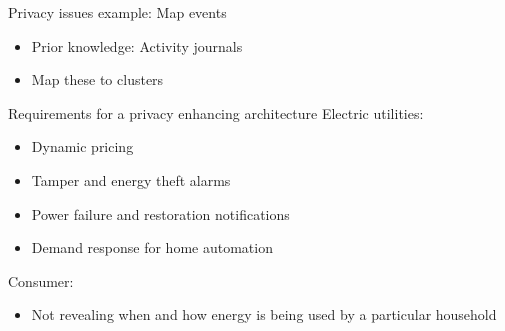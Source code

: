 \documentclass[10pt]{beamer}
\begin{document}
\begin{frame}{Privacy issues example: Map events}
  \begin{itemize}
  \item Prior knowledge: Activity journals
  \item Map these to clusters
  \end{itemize}
\end{frame}

\begin{frame}
\end{frame}


\begin{frame}{Requirements for a privacy enhancing architecture}
  Electric utilities:
  \begin{itemize}
  \item Dynamic pricing
  \item Tamper and energy theft alarms
  \item Power failure and restoration notifications
  \item Demand response for home automation
  \end{itemize}
  Consumer:
  \begin{itemize}
  \item Not revealing when and how energy is being used by a particular household
  \end{itemize}
\end{frame}
\end{document}
